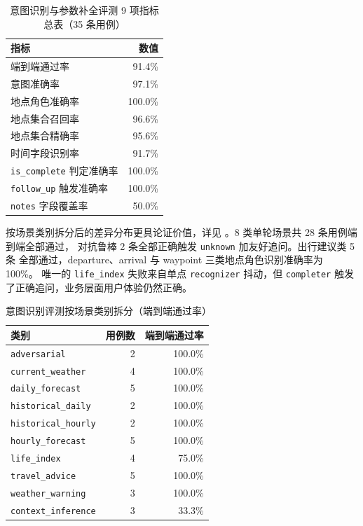 \begin{table}[!htbp]
    \centering
    \caption{意图识别与参数补全评测 9 项指标总表（35 条用例）}
    \label{tab:intent-overall}
    \song\wuhao
    \begin{tabular}{lr}
        \toprule
        指标 & 数值 \\
        \midrule
        端到端通过率 & 91.4\% \\
        意图准确率 & 97.1\% \\
        地点角色准确率 & 100.0\% \\
        地点集合召回率 & 96.6\% \\
        地点集合精确率 & 95.6\% \\
        时间字段识别率 & 91.7\% \\
        \texttt{is\_\bk{}complete} 判定准确率 & 100.0\% \\
        \texttt{follow\_\bk{}up} 触发准确率 & 100.0\% \\
        \texttt{notes} 字段覆盖率 & 50.0\% \\
        \bottomrule
    \end{tabular}
\end{table}

按场景类别拆分后的差异分布更具论证价值，详见
。8 类单轮场景共 28 条用例端到端全部通过，
对抗鲁棒 2 条全部正确触发 \texttt{unknown} 加友好追问。出行建议类 5 条
全部通过，departure、arrival 与 waypoint 三类地点角色识别准确率为 100\%。
唯一的 \texttt{life\_\bk{}index} 失败来自单点 \texttt{recognizer} 抖动，但
\texttt{completer} 触发了正确追问，业务层面用户体验仍然正确。

\begin{table}[!htbp]
    \centering
    \caption{意图识别评测按场景类别拆分（端到端通过率）}
    \label{tab:intent-by-category}
    \song\fontsize{9pt}{12pt}\selectfont
    \renewcommand{\arraystretch}{0.95}
    \begin{tabular}{lrr}
        \toprule
        类别 & 用例数 & 端到端通过率 \\
        \midrule
        \texttt{adversarial} & 2 & 100.0\% \\
        \texttt{current\_\bk{}weather} & 4 & 100.0\% \\
        \texttt{daily\_\bk{}forecast} & 5 & 100.0\% \\
        \texttt{historical\_\bk{}daily} & 2 & 100.0\% \\
        \texttt{historical\_\bk{}hourly} & 2 & 100.0\% \\
        \texttt{hourly\_\bk{}forecast} & 5 & 100.0\% \\
        \texttt{life\_\bk{}index} & 4 & 75.0\% \\
        \texttt{travel\_\bk{}advice} & 5 & 100.0\% \\
        \texttt{weather\_\bk{}warning} & 3 & 100.0\% \\
        \texttt{context\_\bk{}inference} & 3 & 33.3\% \\
        \bottomrule
    \end{tabular}
\end{table}

